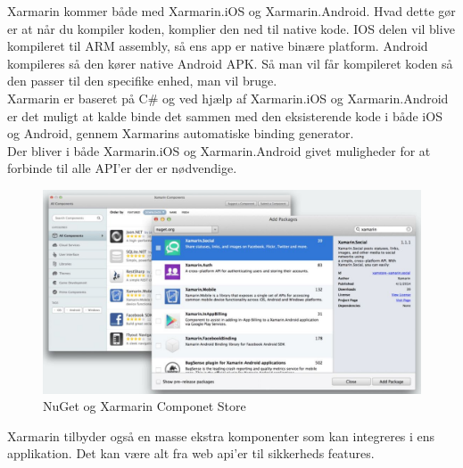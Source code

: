 \clearpage

Xarmarin kommer både med Xarmarin.iOS og Xarmarin.Android. Hvad dette gør er at når du kompiler koden, komplier den ned til native kode. IOS delen vil blive kompileret til ARM assembly, så ens app er native binære platform. Android kompileres så den kører native Android APK. Så man vil får kompileret koden så den passer til den specifike enhed, man vil bruge. \\
Xarmarin er baseret på C\# og ved hjælp af Xarmarin.iOS og Xarmarin.Android er det muligt at kalde binde det sammen med den eksisterende kode i både iOS og Android, gennem Xarmarins automatiske binding generator. \\
Der bliver i både Xarmarin.iOS og Xarmarin.Android givet muligheder for at forbinde til alle API'er der er nødvendige. \\

\begin{figure}[H]
	\centering
	\includegraphics[width=0.7\linewidth]{Applikation/NuGet.JPG}
	\caption{NuGet og Xarmarin Componet Store}
	\label{fig:NuGet}
\end{figure}
Xarmarin tilbyder også en masse ekstra komponenter som kan integreres i ens applikation. Det kan være alt fra web api'er til sikkerheds features.

\clearpage